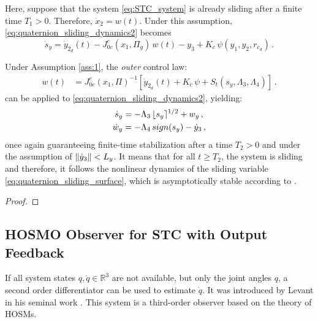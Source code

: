 \begin{assumption}
\label{ass:1}
Here, suppose that the system \eqref{eq:STC_system} is already sliding after a finite time $T_1>0$. Therefore, $\dot{x}_2 = w(t)$. Under this assumption, \eqref{eq:quaternion_sliding_dynamics2} becomes 
$$\dot{s}_y = \dot{y}_{2_d}(t) - J^{c}_{0c}(x_1,\Pi_g) \, w(t) - y_3 + K_{c} \, \psi(y_1,y_2,r_{c_d})\,.$$
\end{assumption}

Under Assumption \ref{ass:1}, the {\it outer} control law:
%
\begin{align}
w(t) &\!=\! J^{c}_{0c}(x_1,\Pi)^{-1} \left[\dot{y}_{2_d}(t) \!+\! K_{c} \, \psi \!+\! S_t(s_y,\Lambda_3,\Lambda_4)\right] \,.
\label{eq:quaternion_w_sliding}
\end{align}
%
can be applied to \eqref{eq:quaternion_sliding_dynamics2}, yielding:
%
\begin{align}
\dot{s}_y &= - \Lambda_3 \, \lfloor s_y \rceil^{1/2} + w_y \,, \nonumber \\
\dot{w}_y &= - \Lambda_4 \, sign(s_y) - \dot{y}_3 \,,
\label{eq:quaternion_STC_outer_system}
\end{align}
%
once again guaranteeing finite-time stabilization after a time $T_2>0$ and under the assumption of $\left\lVert\dot{y}_3\right\rVert < L_y$. 
%
It means that for all $t \ge T_2$, the system is sliding and therefore, it follows the nonlinear dynamics of the sliding variable \eqref{eq:quaternion_sliding_surface}, which is asymptotically stable according to \cite{Siciliano2009}.

\begin{theorem}

\end{theorem}

\begin{proof}

\end{proof}

\subsection{HOSMO Observer for STC with Output Feedback}
\label{sec:STC_output_feedback}

If all system states $q,\dot{q} \in \mathbb{R}^3$ are not available, but only the joint angles $q$, 
a second order differentiator can be used to estimate $\dot{q}$.
%
It was introduced by Levant in his seminal work \rev{\cite{}}. This system is a third-order observer based on the theory of HOSMs. 

